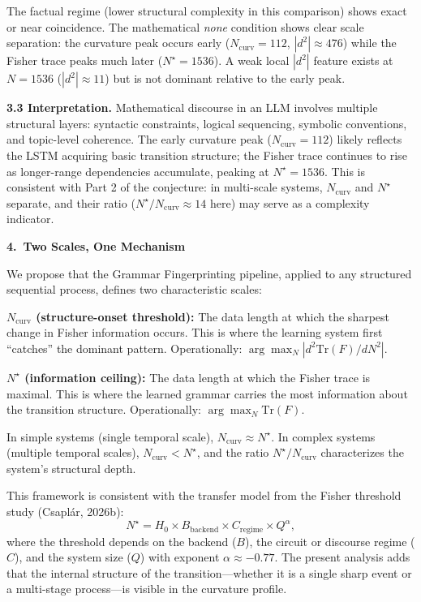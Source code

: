 \documentclass[11pt,a4paper]{article}
\begin{document}
The factual regime (lower structural complexity in this comparison) shows exact or near coincidence. The mathematical \emph{none} condition shows clear scale separation: the curvature peak occurs early ($N_{\mathrm{curv}}=112$, $|d^2|\approx 476$) while the Fisher trace peaks much later ($N^\star=1536$). A weak local $|d^2|$ feature exists at $N=1536$ ($|d^2|\approx 11$) but is not dominant relative to the early peak.

\textbf{3.3 Interpretation.} Mathematical discourse in an LLM involves multiple structural layers: syntactic constraints, logical sequencing, symbolic conventions, and topic-level coherence. The early curvature peak ($N_{\mathrm{curv}}=112$) likely reflects the LSTM acquiring basic transition structure; the Fisher trace continues to rise as longer-range dependencies accumulate, peaking at $N^\star=1536$. This is consistent with Part 2 of the conjecture: in multi-scale systems, $N_{\mathrm{curv}}$ and $N^\star$ separate, and their ratio ($N^\star/N_{\mathrm{curv}}\approx 14$ here) may serve as a complexity indicator.

\vspace{0.5em}
\textbf{4.\ Two Scales, One Mechanism}

We propose that the Grammar Fingerprinting pipeline, applied to any structured sequential process, defines two characteristic scales:

\textbf{$N_{\mathrm{curv}}$ (structure-onset threshold):} The data length at which the sharpest change in Fisher information occurs. This is where the learning system first ``catches'' the dominant pattern. Operationally: $\arg\max_N |d^2\mathrm{Tr}(F)/dN^2|$.

\textbf{$N^\star$ (information ceiling):} The data length at which the Fisher trace is maximal. This is where the learned grammar carries the most information about the transition structure. Operationally: $\arg\max_N \mathrm{Tr}(F)$.

In simple systems (single temporal scale), $N_{\mathrm{curv}}\approx N^\star$. In complex systems (multiple temporal scales), $N_{\mathrm{curv}}<N^\star$, and the ratio $N^\star/N_{\mathrm{curv}}$ characterizes the system's structural depth.

This framework is consistent with the transfer model from the Fisher threshold study (Csapl\'ar, 2026b):
\[
N^\star = H_0 \times B_{\mathrm{backend}} \times C_{\mathrm{regime}} \times Q^{\alpha},
\]
where the threshold depends on the backend ($B$), the circuit or discourse regime ($C$), and the system size ($Q$) with exponent $\alpha\approx -0.77$. The present analysis adds that the internal structure of the transition---whether it is a single sharp event or a multi-stage process---is visible in the curvature profile.
\end{document}
